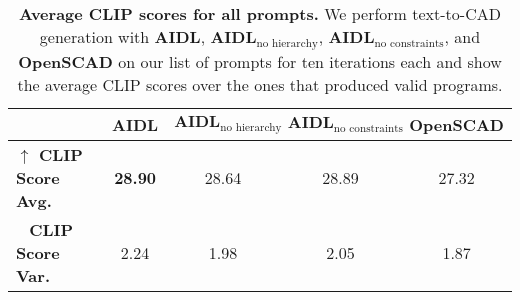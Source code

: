 



\begin{table}[ht]

\centering
\caption{\textbf{Average CLIP scores for all prompts.} We perform text-to-CAD generation with $\textbf{AIDL}$, $\textbf{AIDL}_{\text{no hierarchy}}$, $\textbf{AIDL}_{\text{no constraints}}$, and \textbf{OpenSCAD} on our list of prompts for ten iterations each and show the average CLIP scores over the ones that produced valid programs.}
\label{tab:clip}
\begin{tabular}{lcccc}
\toprule
 & \textbf{AIDL} &$\textbf{AIDL}_{\text{no hierarchy}}$ & $\textbf{AIDL}_{\text{no constraints}}$ & \textbf{OpenSCAD} \\ 
\midrule
\textbf{$\uparrow$ CLIP Score Avg.}              & \textbf{28.90} & 28.64 & 28.89 &27.32 \\ 
\textbf{$\ \ $ CLIP Score Var.}              & 2.24& 1.98 & 2.05 & 1.87 \\ 
\bottomrule
\end{tabular}
\end{table}



